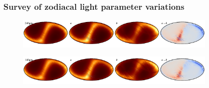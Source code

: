 \documentclass{aa}
\begin{document}
\subsubsection{Survey of zodiacal light parameter variations}

\begin{figure}
    \centering
    \includegraphics[width=0.22\textwidth]{figs/zodi/zodi_10_tot.pdf}\includegraphics[width=0.22\textwidth]{figs/zodi/zodi_10_a.pdf}\includegraphics[width=0.22\textwidth]{figs/zodi/zodi_01_b.pdf}\includegraphics[width=0.22\textwidth]{figs/zodi/zodi_10_a-b.pdf} 
    \vspace{-0.3cm}

    \includegraphics[width=0.22\textwidth]{figs/zodi/zodi_09_tot.pdf}\includegraphics[width=0.22\textwidth]{figs/zodi/zodi_09_a.pdf}\includegraphics[width=0.22\textwidth]{figs/zodi/zodi_02_b.pdf}\includegraphics[width=0.22\textwidth]{figs/zodi/zodi_09_a-b.pdf}
    \vspace{-0.3cm}


\end{figure}
\end{document}
